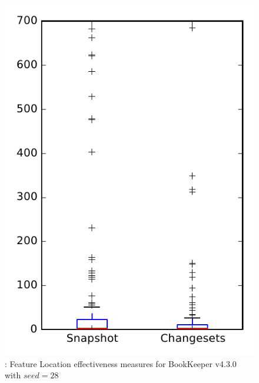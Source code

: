 
\begin{figure}
\centering
\includegraphics[height=0.4\textheight]{figures/flt_seed/rq1_bookkeeper_28}
\caption{\rone: Feature Location effectiveness measures for BookKeeper v4.3.0 with $seed=28$}
\label{fig:flt_seed:rq1:bookkeeper}
\end{figure}
